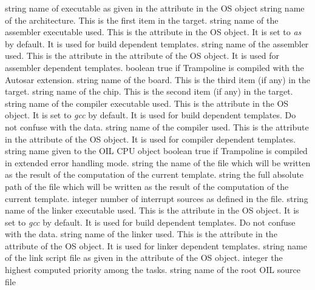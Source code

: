 {string}
{name of executable as given in the  attribute in the OS object} 
{string}
{name of the architecture. This is the first item in the target.} 
{string}
{name of the assembler executable used. This is the  attribute in the OS object. It is set to {\em as} by default. It is used for build dependent templates.} 
{string}
{name of the assembler used. This is the  attribute in the  attribute of the OS object. It is used for assembler dependent templates.} 
{boolean}
{true if Trampoline is compiled with the Autosar extension.} 
{string}
{name of the board. This is the third item (if any) in the target.} 
{string}
{name of the chip. This is the second item (if any) in the target.} 
{string}
{name of the compiler executable used. This is the  attribute in the OS object. It is set to {\em gcc} by default. It is used for build dependent templates. Do not confuse with the  data.} 
{string}
{name of the compiler used. This is the  attribute in the  attribute of the OS object. It is used for compiler dependent templates.} 
{string}
{name given to the OIL CPU object} 
{boolean}
{true if Trampoline is compiled in extended error handling mode.} 
{string}
{the name of the file which will be written as the result of the computation of the current template.} 
{string}
{the full absolute path of the file which will be written as the result of the computation of the current template.} 
{integer}
{number of interrupt sources as defined in the  file.} 
{string}
{name of the linker executable used. This is the  attribute in the OS object. It is set to {\em gcc} by default. It is used for build dependent templates. Do not confuse with the  data.} 
{string}
{name of the linker used. This is the  attribute in the  attribute of the OS object. It is used for linker dependent templates.} 
{string}
{name of the link script file as given in the  attribute of the OS object.} 
{integer}
{the highest computed priority among the tasks.} 
{string}
{name of the root OIL source file} 
